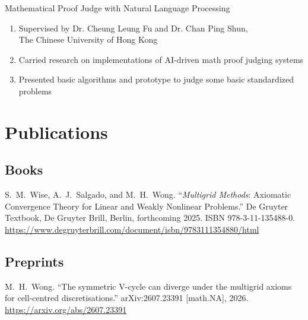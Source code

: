 \documentclass[11pt,letterpaper]{report}
\begin{document}
\begin{tablist}
\begin{enumerate}
        \end{enumerate}
        \vspace{1cm}

        \item[2019] Mathematical Proof Judge with Natural Language Processing
        \begin{enumerate}
            \item Supervised by Dr. Cheung Leung Fu and Dr. Chan Ping Shun,\\
            The Chinese University of Hong Kong
            \item Carried research on implementations of AI-driven math proof judging systems
            \item Presented basic algorithms and prototype to judge some basic standardized problems

        \end{enumerate}

    \end{tablist}



    \section*{Publications}

\subsection*{Books}

\begin{tablist}
    \item[2025] \tab{}S.\ M.\ Wise, A.\ J.\ Salgado, and M.\ H.\ Wong.
    \enquote{\textit{Multigrid Methods}: Axiomatic Convergence Theory for Linear and Weakly Nonlinear Problems.}
    De Gruyter Textbook, De Gruyter Brill, Berlin, forthcoming 2025.
    ISBN 978-3-11-135488-0.\\
    \url{https://www.degruyterbrill.com/document/isbn/9783111354880/html}
\end{tablist}

\subsection*{Preprints}

\begin{tablist}
    \item[2026] \tab{}M.\ H.\ Wong.
    \enquote{The symmetric V-cycle can diverge under the multigrid axioms for cell-centred discretisations.}
    arXiv:2607.23391 [math.NA], 2026.\\
    \url{https://arxiv.org/abs/2607.23391}
\end{tablist}
\end{document}
